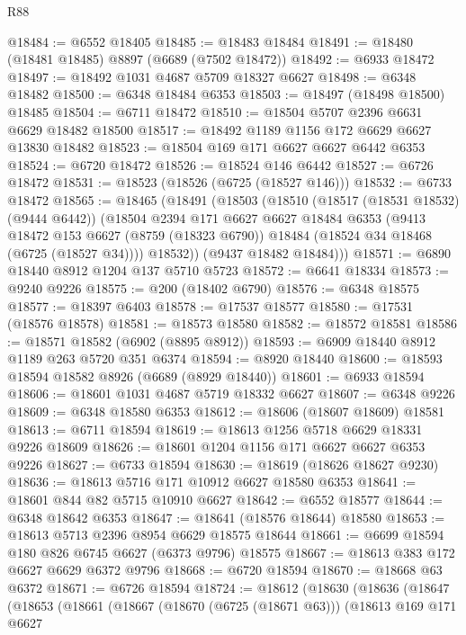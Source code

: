 \begin{lexlean}{R88}
\begin{coremodule}
@18484 := @6552 @18405
@18485 := @18483 @18484
@18491 := @18480 (@18481 @18485) @8897 (@6689 (@7502 @18472))
@18492 := @6933 @18472
@18497 := @18492 @1031 @4687 @5709 @18327 @6627
@18498 := @6348 @18482
@18500 := @6348 @18484 @6353
@18503 := @18497 (@18498 @18500) @18485
@18504 := @6711 @18472
@18510 := @18504 @5707 @2396 @6631 @6629 @18482 @18500
@18517 := @18492 @1189 @1156 @172 @6629 @6627 @13830 @18482
@18523 := @18504 @169 @171 @6627 @6627 @6442 @6353
@18524 := @6720 @18472
@18526 := @18524 @146 @6442
@18527 := @6726 @18472
@18531 := @18523 (@18526 (@6725 (@18527 @146)))
@18532 := @6733 @18472
@18565 := @18465
    (@18491
      (@18503
        (@18510
          (@18517 (@18531 @18532) (@9444 @6442))
          (@18504
            @2394
            @171
            @6627
            @6627
            @18484
            @6353
            (@9413
              @18472
              @153
              @6627
              (@8759 (@18323 @6790))
              @18484
              (@18524 @34 @18468 (@6725 (@18527 @34))))
            @18532))
        (@9437 @18482 @18484)))
@18571 := @6890 @18440 @8912 @1204 @137 @5710 @5723
@18572 := @6641 @18334
@18573 := @9240 @9226
@18575 := @200 (@18402 @6790)
@18576 := @6348 @18575
@18577 := @18397 @6403
@18578 := @17537 @18577
@18580 := @17531 (@18576 @18578)
@18581 := @18573 @18580
@18582 := @18572 @18581
@18586 := @18571 @18582 (@6902 (@8895 @8912))
@18593 := @6909 @18440 @8912 @1189 @263 @5720 @351 @6374
@18594 := @8920 @18440
@18600 := @18593 @18594 @18582 @8926 (@6689 (@8929 @18440))
@18601 := @6933 @18594
@18606 := @18601 @1031 @4687 @5719 @18332 @6627
@18607 := @6348 @9226
@18609 := @6348 @18580 @6353
@18612 := @18606 (@18607 @18609) @18581
@18613 := @6711 @18594
@18619 := @18613 @1256 @5718 @6629 @18331 @9226 @18609
@18626 := @18601 @1204 @1156 @171 @6627 @6627 @6353 @9226
@18627 := @6733 @18594
@18630 := @18619 (@18626 @18627 @9230)
@18636 := @18613 @5716 @171 @10912 @6627 @18580 @6353
@18641 := @18601 @844 @82 @5715 @10910 @6627
@18642 := @6552 @18577
@18644 := @6348 @18642 @6353
@18647 := @18641 (@18576 @18644) @18580
@18653 := @18613 @5713 @2396 @8954 @6629 @18575 @18644
@18661 := @6699 @18594 @180 @826 @6745 @6627 (@6373 @9796) @18575
@18667 := @18613 @383 @172 @6627 @6629 @6372 @9796
@18668 := @6720 @18594
@18670 := @18668 @63 @6372
@18671 := @6726 @18594
@18724 := @18612
    (@18630
      (@18636
        (@18647
          (@18653
            (@18661
              (@18667
                (@18670 (@6725 (@18671 @63)))
                (@18613
                  @169
                  @171
                  @6627

\end{coremodule}
\end{lexlean}

